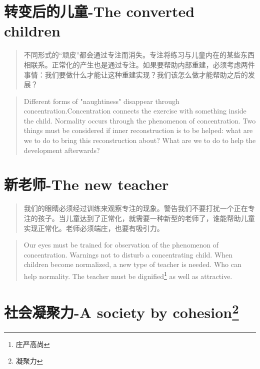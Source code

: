 \documentclass[lang=cn,10pt]{elegantbook}
\begin{document}
\chapter{转变后的儿童-The converted children}

\begin{quote}
  {\small 不同形式的“顽皮”都会通过专注而消失。专注将练习与儿童内在的某些东西相联系。正常化的产生也是通过专注。如果要帮助内部重建，必须考虑两件事情：我们要做什么才能让这种重建实现？我们该怎么做才能帮助之后的发展？}
\end{quote}

\begin{tcolorbox}
\begin{quote}
  {\small Different forms of "naughtiness" disappear through concentration.Concentration connects the exercise with something inside the child. Normality occurs through the phenomenon of concentration. Two things must be considered if inner reconstruction is to be helped: what are we to do to bring this reconstruction about? What are we to do to help the development afterwards?}
\end{quote}
\end{tcolorbox}


\chapter{新老师-The new teacher}

\begin{quote}
  {\small 我们的眼睛必须经过训练来观察专注的现象。警告我们不要打扰一个正在专注的孩子。当儿童达到了正常化，就需要一种新型的老师了，谁能帮助儿童实现正常化。老师必须端庄，也要有吸引力。}
\end{quote}

\begin{tcolorbox}
  \begin{quote}
    {\small Our eyes must be trained for observation of the phenomenon of concentration. Warnings not to disturb a concentrating child. When children become normalized, a new type of teacher is needed. Who can help normality. The teacher must be dignified\footnote{庄严高尚} as well as attractive.}
  \end{quote}
\end{tcolorbox}



\chapter{社会凝聚力-A society by cohesion\footnote{凝聚力}}
\end{document}
